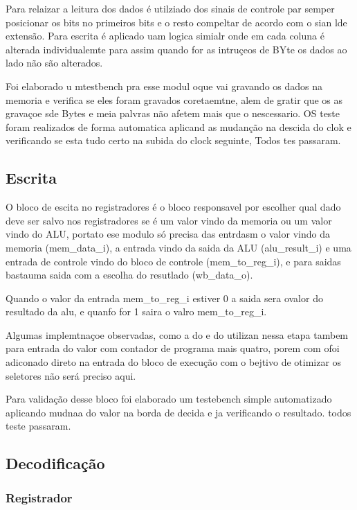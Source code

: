 Para relaizar a leitura dos dados é utilziado dos sinais de controle par semper posicionar os bits no primeiros bits e o resto compeltar de acordo com o sian lde extensão. Para escrita é aplicado uam logica simialr onde em cada coluna é alterada individualemte para assim quando for as intruçeos de BYte os dados  ao lado não são alterados. 

Foi elaborado u mtestbench pra esse modul oque vai gravando os dados na memoria e verifica se eles foram gravados coretaemtne, alem de gratir que os as gravaçoe sde Bytes e meia palvras não afetem mais que o nescessario. OS teste foram realizados de forma automatica aplicand as mudanção na descida do clok e verificando se esta tudo certo na subida do clock seguinte, Todos tes passaram.

\subsection{Escrita}
\label{sub:escrita}

O bloco de escita no registradores é o bloco responsavel por escolher qual dado deve ser salvo nos registradores se é um valor vindo da memoria ou um valor vindo do ALU, portato ese modulo só precisa das entrdasm o valor vindo da memoria (mem_data_i), a entrada vindo da saida da ALU (alu_result_i) e uma entrada de controle vindo do bloco de controle (mem_to_reg_i), e para saidas bastauma saida com a escolha do resutlado (wb_data_o).

Quando o valor da entrada mem_to_reg_i estiver 0 a saida sera ovalor do resultado da alu, e quanfo for 1 saira o valro mem_to_reg_i. 

Algumas implemtnaçoe  observadas, como a do e do  utilizan nessa etapa tambem para entrada do valor com contador de programa mais quatro, porem com ofoi adiconado direto na entrada do bloco de execução com o bejtivo de otimizar os seletores não será preciso aqui.

Para validação desse bloco foi elaborado um testebench simple automatizado aplicando mudnaa do valor na borda de decida e ja verificando o resultado. todos teste passaram.

\subsection{Decodificação}
\label{sub:decodificacao}


\subsubsection{Registrador}
\label{subsub:registrador}

